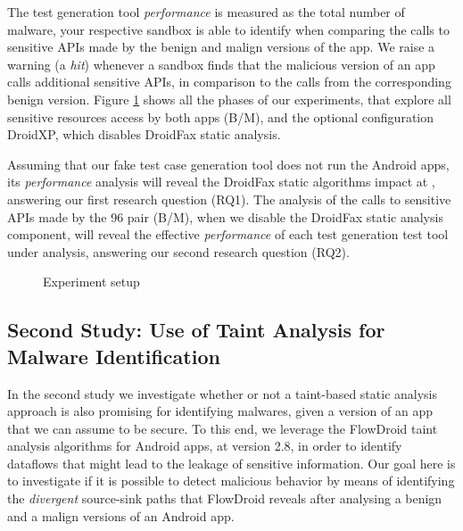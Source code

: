 The test generation tool \emph{performance} is measured as the total number of malware, your respective sandbox is able to identify when comparing the calls to sensitive APIs made by the benign and malign versions of the app. We raise a warning (a \emph{hit}) whenever a sandbox finds that the malicious version of an app calls additional sensitive APIs, in comparison to the calls from the corresponding benign version. Figure \ref{fig:setup} shows all the phases of our experiments, that explore all sensitive resources access by both apps (B/M), and the optional configuration DroidXP, which disables DroidFax static analysis.

Assuming that our fake test case generation tool does not run the Android apps, its \emph{performance} analysis will reveal the DroidFax static algorithms impact at \blls, answering our first research question (RQ1). The analysis of the calls to sensitive APIs made by the 96 pair (B/M), when we disable the DroidFax static analysis component, will reveal the effective \emph{performance} of each test generation test tool under analysis, answering our second research question (RQ2).


\begin{figure}[ht]
   \label{Experiment setup}
   \caption{Experiment setup}
   \label{fig:setup}
 \end{figure}

\subsection{Second Study: Use of Taint Analysis for Malware Identification}\label{sec:set2}

In the second study 
we investigate whether or not a taint-based static analysis approach is also promising for
identifying malwares, given a version of an app that we can assume to be secure.
To this end, we leverage the FlowDroid
taint analysis algorithms for Android apps, at version 2.8, in order to identify dataflows
that might lead to the leakage of sensitive information. Our
goal here is to investigate if it is possible to detect malicious
behavior by means of identifying the \emph{divergent} source-sink paths that FlowDroid reveals after
analysing a benign and a malign versions of an Android app.

